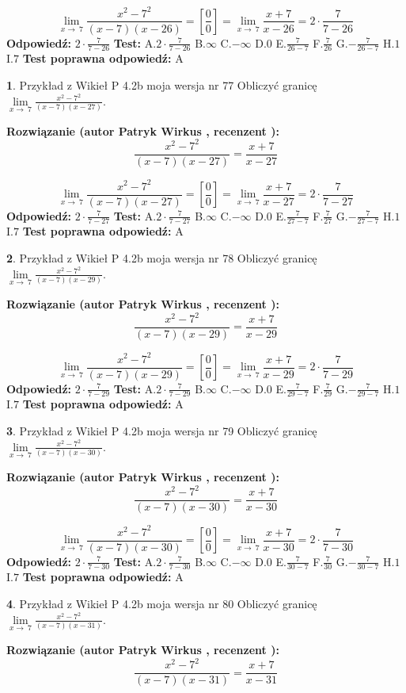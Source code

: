 \documentclass[12pt, a4paper]{article}
\theoremstyle{definition} %
\newtheorem{zad}{}
\newcommand{\zadStart}[1]{\begin{zad}#1\newline}
\newcommand{\zadStop}{\end{zad}}
\newcommand{\rozwStart}[2]{\noindent \textbf{Rozwiązanie (autor #1 , recenzent #2): }\newline}
\newcommand{\rozwStop}{\newline}
\newcommand{\odpStart}{\noindent \textbf{Odpowiedź:}\newline}
\newcommand{\odpStop}{\newline}
\newcommand{\testStart}{\noindent \textbf{Test:}\newline}
\newcommand{\testStop}{\newline}
\newcommand{\kluczStart}{\noindent \textbf{Test poprawna odpowiedź:}\newline}
\newcommand{\kluczStop}{\newline}
\begin{document}
$$\lim\limits_{x\to\ 7}\frac{x^{2}-7^{2}}{(x-7)(x-26)}=[\frac{0}{0}]=\lim\limits_{x\to\ 7}\frac{x+7}{x-26}=2 \cdot \frac{7}{7-26}$$
\rozwStop
\odpStart
$2 \cdot \frac{7}{7-26}$
\odpStop
\testStart
A.$2 \cdot \frac{7}{7-26}$
B.$\infty$
C.$-\infty$
D.$0$
E.$\frac{7}{26-7}$
F.$\frac{7}{26}$
G.$-\frac{7}{26-7}$
H.$1$
I.$7$
\testStop
\kluczStart
A
\kluczStop



\zadStart{Przykład z Wikieł P 4.2b moja wersja nr 77}
Obliczyć granicę $\lim\limits_{x\to\ 7}\frac{x^{2}-7^{2}}{(x-7)(x-27)}$.
\zadStop
\rozwStart{Patryk Wirkus}{}
$$\frac{x^{2}-7^{2}}{(x-7)(x-27)}=\frac{x+7}{x-27}$$

$$\lim\limits_{x\to\ 7}\frac{x^{2}-7^{2}}{(x-7)(x-27)}=[\frac{0}{0}]=\lim\limits_{x\to\ 7}\frac{x+7}{x-27}=2 \cdot \frac{7}{7-27}$$
\rozwStop
\odpStart
$2 \cdot \frac{7}{7-27}$
\odpStop
\testStart
A.$2 \cdot \frac{7}{7-27}$
B.$\infty$
C.$-\infty$
D.$0$
E.$\frac{7}{27-7}$
F.$\frac{7}{27}$
G.$-\frac{7}{27-7}$
H.$1$
I.$7$
\testStop
\kluczStart
A
\kluczStop



\zadStart{Przykład z Wikieł P 4.2b moja wersja nr 78}
Obliczyć granicę $\lim\limits_{x\to\ 7}\frac{x^{2}-7^{2}}{(x-7)(x-29)}$.
\zadStop
\rozwStart{Patryk Wirkus}{}
$$\frac{x^{2}-7^{2}}{(x-7)(x-29)}=\frac{x+7}{x-29}$$

$$\lim\limits_{x\to\ 7}\frac{x^{2}-7^{2}}{(x-7)(x-29)}=[\frac{0}{0}]=\lim\limits_{x\to\ 7}\frac{x+7}{x-29}=2 \cdot \frac{7}{7-29}$$
\rozwStop
\odpStart
$2 \cdot \frac{7}{7-29}$
\odpStop
\testStart
A.$2 \cdot \frac{7}{7-29}$
B.$\infty$
C.$-\infty$
D.$0$
E.$\frac{7}{29-7}$
F.$\frac{7}{29}$
G.$-\frac{7}{29-7}$
H.$1$
I.$7$
\testStop
\kluczStart
A
\kluczStop



\zadStart{Przykład z Wikieł P 4.2b moja wersja nr 79}
Obliczyć granicę $\lim\limits_{x\to\ 7}\frac{x^{2}-7^{2}}{(x-7)(x-30)}$.
\zadStop
\rozwStart{Patryk Wirkus}{}
$$\frac{x^{2}-7^{2}}{(x-7)(x-30)}=\frac{x+7}{x-30}$$

$$\lim\limits_{x\to\ 7}\frac{x^{2}-7^{2}}{(x-7)(x-30)}=[\frac{0}{0}]=\lim\limits_{x\to\ 7}\frac{x+7}{x-30}=2 \cdot \frac{7}{7-30}$$
\rozwStop
\odpStart
$2 \cdot \frac{7}{7-30}$
\odpStop
\testStart
A.$2 \cdot \frac{7}{7-30}$
B.$\infty$
C.$-\infty$
D.$0$
E.$\frac{7}{30-7}$
F.$\frac{7}{30}$
G.$-\frac{7}{30-7}$
H.$1$
I.$7$
\testStop
\kluczStart
A
\kluczStop



\zadStart{Przykład z Wikieł P 4.2b moja wersja nr 80}
Obliczyć granicę $\lim\limits_{x\to\ 7}\frac{x^{2}-7^{2}}{(x-7)(x-31)}$.
\zadStop
\rozwStart{Patryk Wirkus}{}
$$\frac{x^{2}-7^{2}}{(x-7)(x-31)}=\frac{x+7}{x-31}$$
\end{document}
